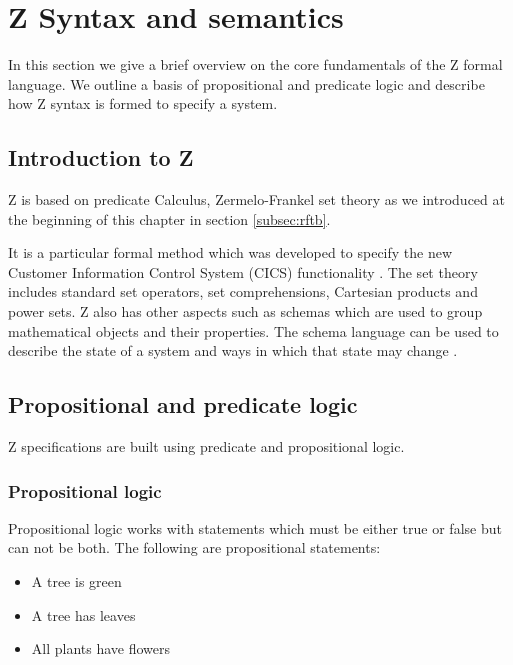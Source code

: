 \section{Z Syntax and semantics}
\label{sec:theznotation}

In this section we give a brief overview on the core fundamentals of the Z
formal language. We outline a basis of propositional and predicate logic and
describe how Z syntax is formed to specify a system.

\subsection{Introduction to Z}


Z is based on predicate Calculus, Zermelo-Frankel set theory as we introduced at
the beginning of this chapter in section \ref{subsec:rftb}.

It is a particular formal method which was developed to specify the new Customer
Information Control System (CICS) functionality \cite{cics}. The set theory
includes standard set operators, set comprehensions, Cartesian products and
power sets. Z also has other aspects such as schemas which are used to group
mathematical objects and their properties. The schema language can be used to
describe the state of a system and ways in which that state may change
\cite{Woodcock:1996:UZS:235337}.

\subsection{Propositional and predicate logic}

Z specifications are built using predicate and propositional logic.

\subsubsection{Propositional logic}

Propositional logic works with statements which must be either true or false but
can not be both. The following are propositional statements:
\begin{itemize}
\item A tree is green

\item A tree has leaves

\item All plants have flowers
\end{itemize}

